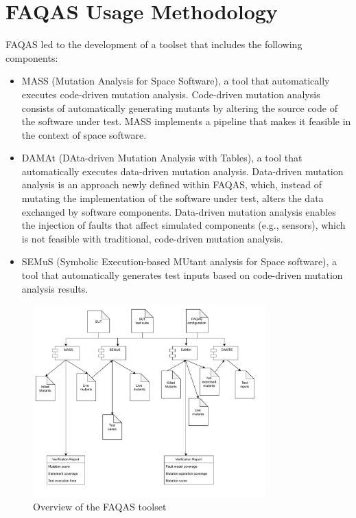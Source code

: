 
\chapter{FAQAS Usage Methodology}
\label{chapter:methodology}

FAQAS led to the development of a toolset that includes the following components:
\begin{itemize}
\item MASS (Mutation Analysis for Space Software), a tool that automatically executes code-driven mutation analysis. Code-driven mutation analysis consists of automatically generating mutants by altering the source code of the software under test. MASS implements a pipeline that makes it feasible in the context of space software.
\item DAMAt (DAta-driven Mutation Analysis with Tables), a tool that automatically executes data-driven mutation analysis. Data-driven mutation analysis is an approach newly defined within FAQAS, which, instead of mutating the implementation of the software under test, alters the data exchanged by software components. Data-driven mutation analysis enables the injection of faults that affect simulated components (e.g., sensors), which is not feasible with traditional, code-driven mutation analysis.
\item SEMuS (Symbolic Execution-based MUtant analysis for Space software), a tool that automatically generates test inputs based on code-driven mutation analysis results.
\end{itemize}

\begin{figure}[tb]
\begin{center}
\includegraphics[width=0.8\textwidth]{images/FAQAS_drawio}
\caption{Overview of the FAQAS toolset}
\label{fig:FAQAS:toolset}
\end{center}
\end{figure}

